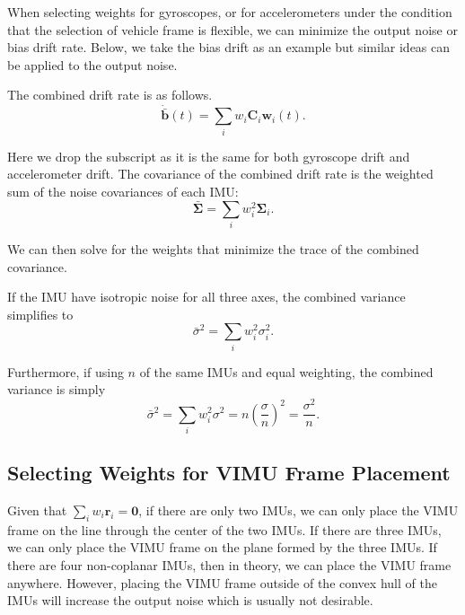\documentclass[conference]{IEEEtran}
\begin{document}
When selecting weights for gyroscopes, or for accelerometers under the condition that the selection of vehicle frame is flexible, we can minimize the output noise or bias drift rate. Below, we take the bias drift as an example but similar ideas can be applied to the output noise.

The combined drift rate is as follows.
\begin{equation}
    \dot{\bar{\textbf{b}}}(t) = \sum_i{w_i \textbf{C}_i \textbf{w}_i(t)}.
\end{equation}

\noindent Here we drop the subscript as it is the same for both gyroscope drift and accelerometer drift. The covariance of the combined drift rate is the weighted sum of the noise covariances of each IMU:
\begin{equation}
    \bar{\bm{\Sigma}} = \sum_i{w_i^2 \bm{\Sigma}_i}.
\end{equation}

\noindent We can then solve for the weights that minimize the trace of the combined covariance.

If the IMU have isotropic noise for all three axes, the combined variance simplifies to
\begin{equation}\label{noise_reduction_asym}
    \bar{\sigma}^2 = \sum_i{w_i^2 \sigma_i^2}.
\end{equation}

\noindent Furthermore, if using $n$ of the same IMUs and equal weighting, the combined variance is simply
\begin{equation}\label{noise_reduction_sym}
    \bar{\sigma}^2 = \sum_i{w_i^2 \sigma^2} = n \left(\frac{\sigma}{n}\right)^2 = \frac{\sigma^2}{n}.
\end{equation}

\subsection{Selecting Weights for VIMU Frame Placement}

Given that $\sum_i{w_i \textbf{r}_i} = \textbf{0}$, if there are only two IMUs, we can only place the VIMU frame on the line through the center of the two IMUs. If there are three IMUs, we can only place the VIMU frame on the plane formed by the three IMUs. If there are four non-coplanar IMUs, then in theory, we can place the VIMU frame anywhere. However, placing the VIMU frame outside of the convex hull of the IMUs will increase the output noise which is usually not desirable.
\end{document}
